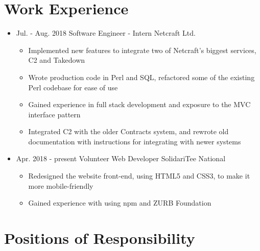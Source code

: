 \documentclass[11pt,a4paper,sans]{moderncv}        %
\begin{document}
\section{Work Experience}

\begin{itemize}

\item{
\cventry
{Jul. - Aug. 2018}
{Software Engineer - Intern}
{Netcraft Ltd.}
{}{}{
\begin{itemize}
\item Implemented new features to integrate two of Netcraft's biggest services, C2 and Takedown
\item Wrote production code in Perl and SQL, refactored some of the existing Perl codebase for ease of use
\item Gained experience in full stack development and exposure to the MVC interface pattern
\item Integrated C2 with the older Contracts system, and rewrote old documentation with instructions for integrating with newer systems
\end{itemize}
}}

\item{
\cventry
{Apr. 2018 - present}
{Volunteer Web Developer}
{SolidariTee National}
{}{}{
\begin{itemize}
\item Redesigned the website front-end, using HTML5 and CSS3, to make it more mobile-friendly
\item Gained experience with using npm and ZURB Foundation
\end{itemize}
}}

\end{itemize}

\section{Positions of Responsibility}
\end{document}
